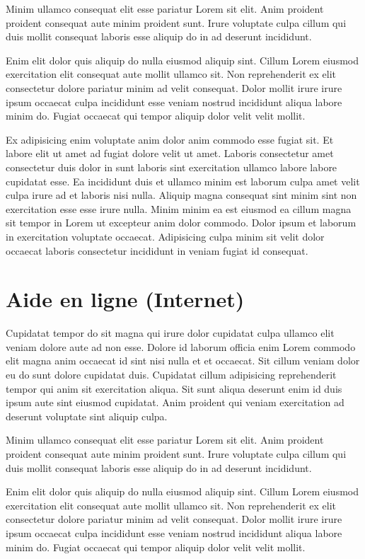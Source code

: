 \documentclass[a4paper,10pt,french]{sphinxmanual}
\begin{document}
Minim ullamco consequat elit esse pariatur Lorem sit elit. Anim proident proident consequat aute minim proident sunt. Irure voluptate culpa cillum qui duis mollit consequat laboris esse aliquip do in ad deserunt incididunt.

Enim elit dolor quis aliquip do nulla eiusmod aliquip sint. Cillum Lorem eiusmod exercitation elit consequat aute mollit ullamco sit. Non reprehenderit ex elit consectetur dolore pariatur minim ad velit consequat. Dolor mollit irure irure ipsum occaecat culpa incididunt esse veniam nostrud incididunt aliqua labore minim do. Fugiat occaecat qui tempor aliquip dolor velit velit mollit.

Ex adipisicing enim voluptate anim dolor anim commodo esse fugiat sit. Et labore elit ut amet ad fugiat dolore velit ut amet. Laboris consectetur amet consectetur duis dolor in sunt laboris sint exercitation ullamco labore labore cupidatat esse. Ea incididunt duis et ullamco minim est laborum culpa amet velit culpa irure ad et laboris nisi nulla. Aliquip magna consequat sint minim sint non exercitation esse esse irure nulla. Minim minim ea est eiusmod ea cillum magna sit tempor in Lorem ut excepteur anim dolor commodo. Dolor ipsum et laborum in exercitation voluptate occaecat. Adipisicing culpa minim sit velit dolor occaecat laboris consectetur incididunt in veniam fugiat id consequat.


\section{Aide en ligne (Internet)}
\label{\detokenize{docs/refs/autocad-help:aide-en-ligne-internet}}
Cupidatat tempor do sit magna qui irure dolor cupidatat culpa ullamco elit veniam dolore aute ad non esse. Dolore id laborum officia enim Lorem commodo elit magna anim occaecat id sint nisi nulla et et occaecat. Sit cillum veniam dolor eu do sunt dolore cupidatat duis. Cupidatat cillum adipisicing reprehenderit tempor qui anim sit exercitation aliqua. Sit sunt aliqua deserunt enim id duis ipsum aute sint eiusmod cupidatat. Anim proident qui veniam exercitation ad deserunt voluptate sint aliquip culpa.

Minim ullamco consequat elit esse pariatur Lorem sit elit. Anim proident proident consequat aute minim proident sunt. Irure voluptate culpa cillum qui duis mollit consequat laboris esse aliquip do in ad deserunt incididunt.

Enim elit dolor quis aliquip do nulla eiusmod aliquip sint. Cillum Lorem eiusmod exercitation elit consequat aute mollit ullamco sit. Non reprehenderit ex elit consectetur dolore pariatur minim ad velit consequat. Dolor mollit irure irure ipsum occaecat culpa incididunt esse veniam nostrud incididunt aliqua labore minim do. Fugiat occaecat qui tempor aliquip dolor velit velit mollit.
\end{document}
